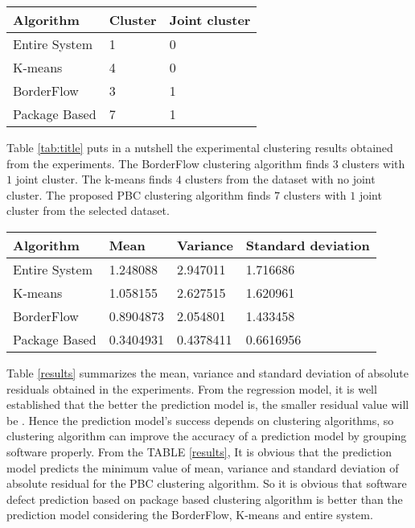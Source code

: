 \documentclass[12pt]{report}
\begin{document}
\begin{center}
\centering
{}
 \label{tab:title} 
    \begin{tabular}{ | p{4cm} | p{4cm} | p{4cm} |}
			\hline
					Algorithm & Cluster & Joint cluster \\ \hline
					Entire System &	1 &	0\\ \hline
					K-means &	4	& 0\\ \hline
					BorderFlow	& 3 &	1\\ \hline
					Package Based &	7 &	1\\ 
			\hline
    \end{tabular}
	\end{center}
\newpage

Table \ref{tab:title} puts in a nutshell the experimental clustering results obtained from the experiments. The BorderFlow clustering algorithm finds $3$ clusters with $1$ joint cluster. The k-means finds $4$ clusters from the dataset with no joint cluster. The proposed PBC clustering algorithm finds $7$ clusters with $1$ joint cluster from the selected dataset.

\begin{center}
\centering
{} \label{results} 
    \begin{tabular}{ | p{3cm} | p{3cm} | p{3cm} |p{3cm}|}
			\hline
				Algorithm &	Mean	& Variance &	Standard deviation \\ \hline
				Entire System&	1.248088 &	2.947011 &	1.716686\\ \hline
				K-means	& 1.058155 &	2.627515 &	1.620961 \\ \hline
				BorderFlow &	0.8904873	& 2.054801	& 1.433458 \\ \hline
				Package Based &	0.3404931 &	0.4378411 &	0.6616956\\ 
			\hline
    \end{tabular}
\end{center}

Table \ref{results} summarizes the mean, variance and standard deviation of absolute residuals obtained in the experiments. From the regression model, it is well established that the better the prediction model is, the smaller residual value will be \cite{draper1981applied}. Hence the prediction model's success depends on clustering algorithms, so clustering algorithm can improve the accuracy of a prediction model by grouping software properly. From the TABLE \ref{results}, It is obvious that the prediction model predicts the minimum value of mean, variance and standard deviation of absolute residual for the PBC clustering algorithm. So it is obvious that software defect prediction based on package based clustering algorithm is better than the prediction model considering the BorderFlow, K-means and entire system.
 
\end{document}
